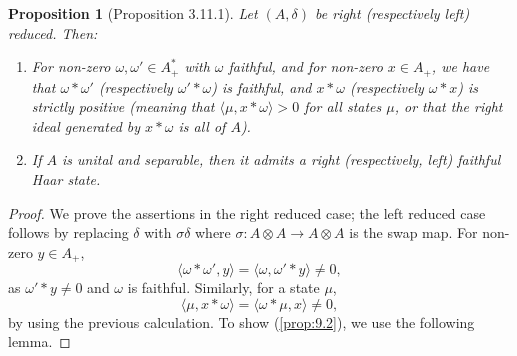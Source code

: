 \documentclass[a4paper,12pt]{article}
\theoremstyle{plain}
\newtheorem{proposition}{Proposition}[section]
\theoremstyle{definition}
\newcommand{\ip}[2]{{\langle {#1} , {#2} \rangle}}
\begin{document}
\begin{proposition}[Proposition 3.11.1]\label{prop:9}
Let $(A,\delta)$ be right (respectively left) reduced.  Then:
\begin{enumerate}
\item\label{prop:9.1} For non-zero $\omega,\omega'\in A^*_+$ with
$\omega$ faithful, and for non-zero $x\in A_+$, we have that
$\omega*\omega'$ (respectively $\omega'*\omega$) is faithful, and
$x*\omega$ (respectively $\omega*x$) is strictly positive
(meaning that $\ip{\mu}{x*\omega}>0$ for all states $\mu$,
or that the right ideal generated by $x*\omega$ is all of $A$).
\item\label{prop:9.2} If $A$ is unital and separable, then it admits
a right (respectively, left) faithful Haar state.
\end{enumerate}
\end{proposition}
\begin{proof}
We prove the assertions in the right reduced case; the left reduced case
follows by replacing $\delta$ with $\sigma\delta$ where $\sigma:A\otimes A
\rightarrow A\otimes A$ is the swap map.  For non-zero $y\in A_+$,
\[ \ip{\omega*\omega'}{y} = \ip{\omega}{\omega'*y} \not= 0, \]
as $\omega'*y\not=0$ and $\omega$ is faithful.  Similarly, for a state $\mu$,
\[ \ip{\mu}{x*\omega} = \ip{\omega*\mu}{x} \not=0, \]
by using the previous calculation.  To show (\ref{prop:9.2}), we
use the following lemma.
\end{proof}
\end{document}
